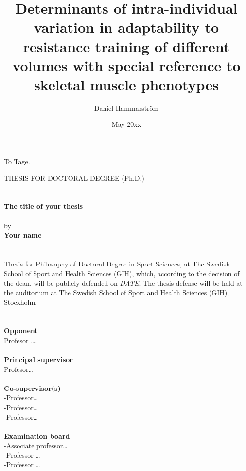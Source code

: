 \documentclass[twoside,10pt]{gihclass} %
\title{Determinants of intra-individual variation in adaptability to resistance training of different volumes with special reference to skeletal muscle phenotypes}
\author{Daniel Hammarström}
\date{May 20xx}
\begin{document}


\frontmatter %
  \maketitle
  \begin{dedication}
\vspace*{\fill}
 To Tage.
\vspace*{\fill}
  \end{dedication}
\begin{defence}
    THESIS FOR DOCTORAL DEGREE (Ph.D.)\\
    ~\\
    ~\\
    \textbf{The title of your thesis}\\
    ~\\
    by\\
    \textbf{Your name}\\
    ~\\
    ~\\
    Thesis for Philosophy of Doctoral Degree in Sport Sciences, at The Swedish School of Sport and Health Sciences (GIH), which, according to the decision of the dean, will be publicly defended on \emph{DATE}. The thesis defense will be held at the auditorium at The Swedish School of Sport and Health Sciences (GIH), Stockholm.\\
    ~\\
    ~\\
    \textbf{Opponent}\\
    Profesor \ldots.\\
    ~\\
    \textbf{Principal supervisor}\\
    Profesor\ldots{}\\
    ~\\
    \textbf{Co-supervisor(s)}\\
    -Professor\ldots{}\\
    -Professor\ldots{}\\
    -Professor\ldots{}\\
    ~\\
    \textbf{Examination board}\\
    -Associate professor\ldots{}\\
    -Professor \ldots{}\\
    -Professor \ldots{}
  \end{defence}
\end{document}
